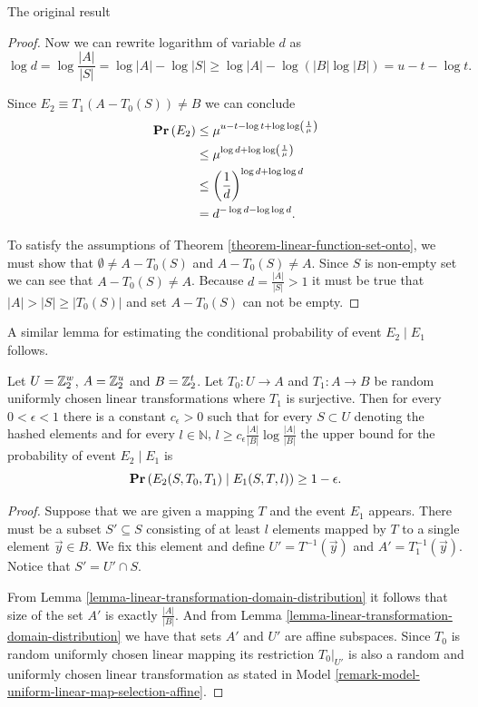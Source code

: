 \begin{section}{The original result}
\begin{proof}
Now we can rewrite logarithm of variable $d$ as 
\[
	\log d = \log \frac{|A|}{|S|} = \log |A| - \log |S| \geq \log |A| - \log (|B| \log |B|) = u - t - \log t \text{.}
\]

Since $E_2 \equiv T_1(A - T_0(S)) \neq B$ we can conclude
\[
\begin{split}
\mathbf{Pr}\left(E_2\right)
	& \leq \mu^{u - t - \log t + \log \log \left(\frac{1}{\mu}\right)} \\
	& \leq \mu ^ {\log d + \log \log \left(\frac{1}{\mu}\right)} \\
	& \leq \left(\frac{1}{d}\right) ^ {\log d + \log \log d} \\
	& = d ^ {-\log d - \log \log d} \text{.} \\
\end{split}
\]

To satisfy the assumptions of Theorem \ref{theorem-linear-function-set-onto}, we must show that $\emptyset \neq A - T_0(S)$ and $A - T_0(S) \neq A$. Since $S$ is non-empty set we can see that $A - T_0(S) \neq A$. Because $d = \frac{|A|}{|S|} > 1$ it must be true that $|A| > |S| \geq |T_0(S)|$ and set $A - T_0(S)$ can not be empty.
\end{proof}

A similar lemma for estimating the conditional probability of event $E_2 \mid E_1$ follows.
\begin{remark}
\label{remark-prob-l-length-chain}
Let $U = \mathbb{Z}_{2}^{w}$, $A = \mathbb{Z}_{2}^{u}$ and $B = \mathbb{Z}_{2}^{t}$. Let $T_0: U \rightarrow A$ and $T_1: A \rightarrow B$ be random uniformly chosen linear transformations where $T_1$ is surjective. Then for every $0 < \epsilon < 1$ there is a constant $c_{\epsilon} > 0$ such that for every $S \subset U$ denoting the hashed  elements and for every $l \in \mathbb{N}$, $l \geq c_{\epsilon}{\frac{|A|}{|B|}}\log\frac{|A|}{|B|}$ the upper bound for the probability of event $E_2 \mid E_1$ is
\[
	\mathbf{Pr}\left(E_2(S, T_0, T_1) \mid E_1(S, T, l)\right) \geq 1 - \epsilon \text{.}
\]
\end{remark}
\begin{proof}
Suppose that we are given a mapping $T$ and the event $E_1$ appears. There must be a subset $S' \subseteq S$ consisting of at least $l$ elements mapped by $T$ to a single element $\vec{y} \in B$. We fix this element and define $U' = T^{-1}(\vec{y})$ and $A' = T_1^{-1}(\vec{y})$. Notice that $S' = U' \cap S$.

From Lemma \ref{lemma-linear-transformation-domain-distribution} it follows that size of the set $A'$ is exactly $\frac{|A|}{|B|}$. And from Lemma \ref{lemma-linear-transformation-domain-distribution} we have that sets $A'$ and $U'$ are affine subspaces. Since $T_0$ is random uniformly chosen linear mapping its restriction $T_0|_{U'}$ is also a random and uniformly chosen linear transformation as stated in Model \ref{remark-model-uniform-linear-map-selection-affine}.


\end{proof}
\end{section}
